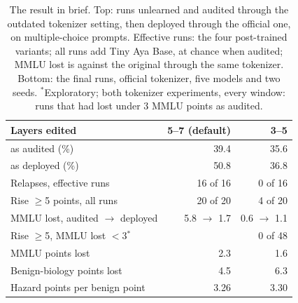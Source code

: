 \begin{table}[!b]
\centering\small\setlength{\tabcolsep}{3.8pt}
\begin{tabular}{@{}lrr@{}}
\toprule
Layers edited & 5--7 (default) & 3--5 \\
\midrule
\wmdp{} as audited (\%) & 39.4 & 35.6 \\
\wmdp{} as deployed (\%) & 50.8 & 36.8 \\
Relapses, effective runs & 16 of 16 & 0 of 16 \\
Rise $\geq$5 points, all runs & 20 of 20 & 4 of 20 \\
MMLU lost, audited $\rightarrow$ deployed & 5.8 $\rightarrow$ 1.7 & 0.6 $\rightarrow$ 1.1 \\
Rise $\geq$5, MMLU lost $<$3$^\ast$ & \multicolumn{2}{r}{0 of 48} \\
\midrule
MMLU points lost & 2.3 & 1.6 \\
Benign-biology points lost & 4.5 & 6.3 \\
Hazard points per benign point & 3.26 & 3.30 \\
\bottomrule
\end{tabular}
\caption{The result in brief. Top: runs unlearned and audited through the outdated tokenizer setting, then deployed through the official one, on multiple-choice prompts. Effective runs: the four post-trained variants; all runs add Tiny Aya Base, at chance when audited; MMLU lost is against the original through the same tokenizer. Bottom: the final runs, official tokenizer, five models and two seeds. $^\ast$Exploratory; both tokenizer experiments, every window: runs that had lost under 3 MMLU points as audited.}
\label{tab:glance}
\end{table}

